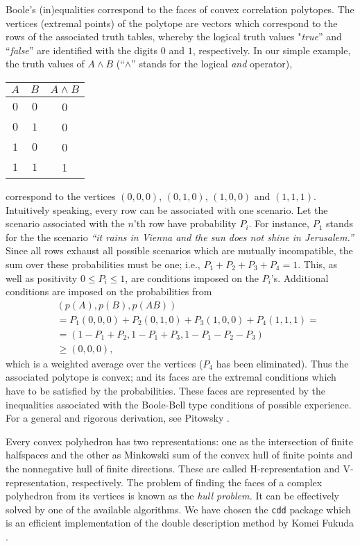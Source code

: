 Boole's (in)equalities correspond to the faces of convex correlation polytopes.
The vertices (extremal points) of the polytope are vectors  which correspond to the rows
of the associated  truth tables,
whereby the logical truth values "{\em true}'' and ``{\em false}''
are identified with the digits $0$ and $1$, respectively.
In our simple example, the truth values of $A\wedge B$ (``$\wedge$'' stands for the logical {\em and} operator),
\begin{center}
\begin{tabular}{ccc}
 \hline\hline
$A$&$B$&$A\wedge B$\\
 \hline
$0$&$0$&0\\
$0$&$1$&0\\
$1$&$0$&0\\
$1$&$1$&1\\
 \hline\hline
\end{tabular}
\end{center}
correspond to the vertices
$(0,0,0)$,
$(0,1,0)$,
$(1,0,0)$ and
$(1,1,1)$.
Intuitively speaking, every row can be associated with one scenario.
Let the scenario associated with the $n$'th row have probability $P_i$.
For instance, $P_1$ stands for the the scenario {\em ``it rains in Vienna and the sun does not shine in Jerusalem.''}
Since all rows exhaust all possible scenarios which are mutually incompatible,
the sum over these probabilities must be one; i.e.,
$P_1+P_2+P_3+P_4=1$.
This, as well as positivity $0\le P_i\le 1$, are  conditions imposed on the $P_i$'s.
Additional conditions are imposed on the probabilities from
\begin{eqnarray}
&&(p(A),p(B),p(AB))\nonumber\\
&&=P_1(0,0,0)+P_2(0,1,0)+P_3(1,0,0)+P_4(1,1,1)=\nonumber\\
&&=(1-P_1+P_2,1-P_1+P_3,1-P_1-P_2-P_3)\nonumber\\
&&\ge (0,0,0) ,\nonumber
\end{eqnarray}
which is a weighted average over the vertices ($P_4$ has been eliminated).
Thus the associated polytope is convex; and its faces are the extremal conditions
which have to be satisfied by the probabilities.
These faces are represented by the inequalities associated
with the Boole-Bell type conditions of possible experience.
For a general and  rigorous derivation, see Pitowsky \cite{pitowsky}.

Every convex polyhedron has two representations:
one as the intersection of finite halfspaces and the other as Minkowski
sum of the convex hull of finite points and the nonnegative hull of finite directions.
These are called H-representation and V-representation, respectively.
The problem of finding the faces of a complex polyhedron from its vertices is known as the {\em hull problem.}
It can be effectively solved by one of the available algorithms.
We have chosen the {\tt cdd} package \cite{cdd-pck} which is an efficient
implementation of the double description method  \cite{MRTT53}
by Komei Fukuda \cite{FP96,fukuda-94,fukuda-pr}.

